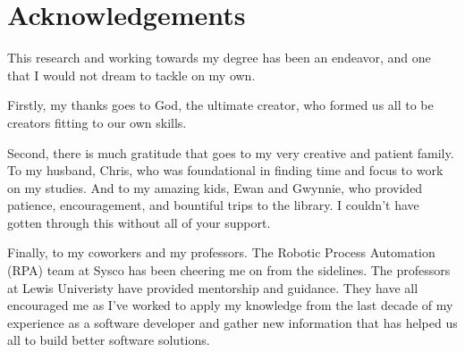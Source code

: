 \section*{Acknowledgements} \label{sectionAcknowledgements}

This research and working towards my degree has been an endeavor, and one that I would not dream to tackle on my own.

Firstly, my thanks goes to God, the ultimate creator, who formed us all to be creators fitting to our own skills.

Second, there is much gratitude that goes to my very creative and patient family. To my husband, Chris, who was foundational in finding time and focus to work on my studies. And to my amazing kids, Ewan and Gwynnie, who provided patience, encouragement, and bountiful trips to the library. I couldn't have gotten through this without all of your support.

Finally, to my coworkers and my professors. The Robotic Process Automation (RPA) team at Sysco has been cheering me on from the sidelines. The professors at Lewis Univeristy have provided mentorship and guidance. They have all encouraged me as I've worked to apply my knowledge from the last decade of my experience as a software developer and gather new information that has helped us all to build better software solutions.
